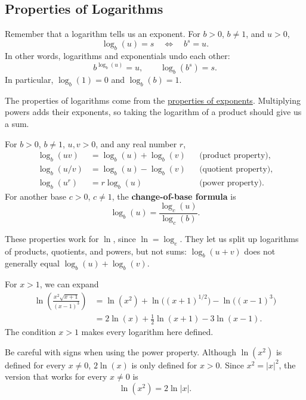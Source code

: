 \subsection{Properties of Logarithms}

Remember that a logarithm tells us an exponent. For $b>0$, $b\ne1$,
and $u>0$,
$$\log_b(u)=s\quad\Longleftrightarrow\quad b^s=u.$$
In other words, logarithms and exponentials undo each other:
$$b^{\log_b(u)}=u,\qquad \log_b(b^s)=s.$$
In particular, $\log_b(1)=0$ and $\log_b(b)=1$.

The properties of logarithms come from the
\hyperref[sec:exponent-properties]{properties of exponents}.
Multiplying powers adds their exponents, so taking the logarithm of
a product should give us a sum.

\begin{thm}
For $b>0$, $b\ne1$, $u,v>0$, and any real number $r$,
\begin{align*}
\log_b(uv)&=\log_b(u)+\log_b(v)
&&\text{(product property)},\\
\log_b(u/v)&=\log_b(u)-\log_b(v)
&&\text{(quotient property)},\\
\log_b(u^r)&=r\log_b(u)
&&\text{(power property)}.
\end{align*}
For another base $c>0$, $c\ne1$, the \textbf{change-of-base formula} is
$$\log_b(u)=\frac{\log_c(u)}{\log_c(b)}.$$
\end{thm}

These properties work for $\ln$, since $\ln=\log_e$. They let us split
up logarithms of products, quotients, and powers, but not sums:
$\log_b(u+v)$ does not generally equal $\log_b(u)+\log_b(v)$.

\begin{exampleblock}
For $x>1$, we can expand
\begin{align*}
\ln\left(\frac{x^2\sqrt{x+1}}{(x-1)^3}\right)
&=\ln(x^2)+\ln\bigl((x+1)^{1/2}\bigr)-\ln\bigl((x-1)^3\bigr)\\
&=2\ln(x)+\frac12\ln(x+1)-3\ln(x-1).
\end{align*}
The condition $x>1$ makes every logarithm here defined.
\end{exampleblock}

Be careful with signs when using the power property. Although $\ln(x^2)$
is defined for every $x\ne0$, $2\ln(x)$ is only defined for $x>0$.
Since $x^2=|x|^2$, the version that works for every $x\ne0$ is
$$\ln(x^2)=2\ln|x|.$$

